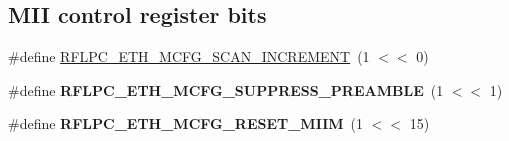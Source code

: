 \subsection*{M\-I\-I control register bits}
\begin{DoxyCompactItemize}
\item 
\#define \hyperlink{group__eth_ga32eaa75ff95be30d518ad30473874040}{R\-F\-L\-P\-C\-\_\-\-E\-T\-H\-\_\-\-M\-C\-F\-G\-\_\-\-S\-C\-A\-N\-\_\-\-I\-N\-C\-R\-E\-M\-E\-N\-T}~(1 $<$$<$ 0)
\item 
\hypertarget{group__eth_gae5f93f580a5346309a65313cc50e59a6}{\#define {\bfseries R\-F\-L\-P\-C\-\_\-\-E\-T\-H\-\_\-\-M\-C\-F\-G\-\_\-\-S\-U\-P\-P\-R\-E\-S\-S\-\_\-\-P\-R\-E\-A\-M\-B\-L\-E}~(1 $<$$<$ 1)}\label{group__eth_gae5f93f580a5346309a65313cc50e59a6}

\item 
\hypertarget{group__eth_gafbb44832ad83576a1d4f7d8ccf9525e9}{\#define {\bfseries R\-F\-L\-P\-C\-\_\-\-E\-T\-H\-\_\-\-M\-C\-F\-G\-\_\-\-R\-E\-S\-E\-T\-\_\-\-M\-I\-I\-M}~(1 $<$$<$ 15)}\label{group__eth_gafbb44832ad83576a1d4f7d8ccf9525e9}

\end{DoxyCompactItemize}
